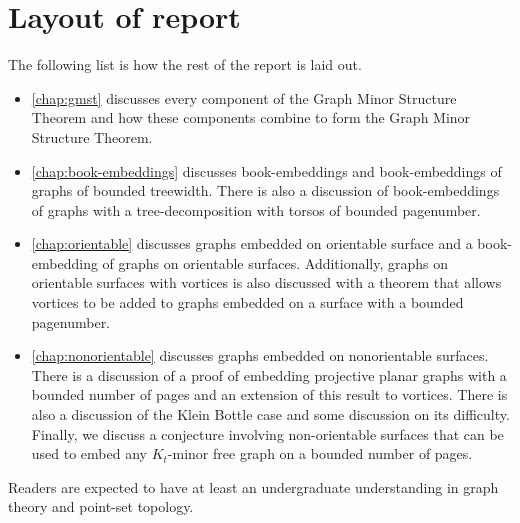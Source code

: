 \section{Layout of report}
The following list is how the rest of the report is laid out. 
\begin{itemize}
	\item \cref{chap:gmst} discusses every component of the Graph Minor Structure Theorem and how these components combine to form the Graph Minor Structure Theorem. 
	\item \cref{chap:book-embeddings} discusses book-embeddings and book-embeddings of graphs of bounded treewidth. There is also a discussion of book-embeddings of graphs with a tree-decomposition with torsos of bounded pagenumber. 
	\item \cref{chap:orientable} discusses graphs embedded on orientable surface and a book-embedding of graphs on orientable surfaces. Additionally, graphs on orientable surfaces with vortices is also discussed with a theorem that allows vortices to be added to graphs embedded on a surface with a bounded pagenumber. 
	\item \cref{chap:nonorientable} discusses graphs embedded on nonorientable surfaces. There is a discussion of a proof of embedding projective planar graphs with a bounded number of pages and an extension of this result to vortices. There is also a discussion of the Klein Bottle case and some discussion on its difficulty. Finally, we discuss a conjecture involving non-orientable surfaces that can be used to embed any $K_t$-minor free graph on a bounded number of pages. 
\end{itemize}

Readers are expected to have at least an undergraduate understanding in graph theory and point-set topology. 
